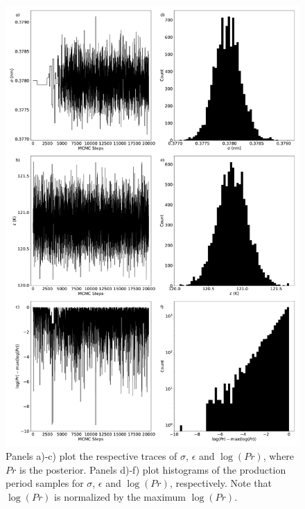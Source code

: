 \documentclass[journal=jctc,manuscript=article]{achemso}
\begin{document}
\begin{figure}[p!]
	\centering
	\includegraphics[width=5.4in]{MCMC_supporting_information}
	\caption{Panels a)-c) plot the respective traces of $\sigma$, $\epsilon$ and $\log(Pr)$, where $Pr$ is the posterior. Panels d)-f) plot histograms of the production period samples for $\sigma$, $\epsilon$ and $\log(Pr)$, respectively. Note that $\log(Pr)$ is normalized by the maximum $\log(Pr)$.}
	\label{fig:MCMC_supporting_information}
\end{figure} 

\newpage
\end{document}
